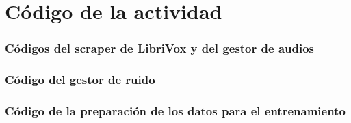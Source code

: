 \chapter{Código de la actividad}

\subsection{Códigos del scraper de LibriVox y del gestor de audios}




\subsection{Código del gestor de ruido}


\subsection{Código de la preparación de los datos para el entrenamiento}


